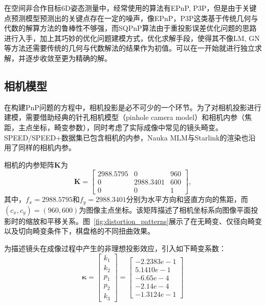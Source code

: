 在空间非合作目标6D姿态测量中，经常使用的算法有EPnP, P3P，但是由于关键点预测模型预测出的关键点存在一定的噪声，像EPnP，P3P这类基于传统几何与代数的解算方法的鲁棒性不够强，而SQPnP算法\cite{terzakis2020consistently}由于重投影误差优化问题的思路进行入手，加上其巧妙的优化问题建模方式，优化求解手段，使得其不像LM, GN等方法还需要传统的几何与代数解法的结果作为初值。可以在一开始就进行独立求解，并逐步收敛至更为精确的解。
\subsection{相机模型}
在构建PnP问题的方程中，相机投影是必不可少的一个环节。为了对相机投影进行建模，需要借助经典的针孔相机模型（pinhole camera model）和相机内参（焦距，主点坐标，畸变参数），同时考虑了实际成像中常见的镜头畸变。SPEED/SPEED+数据集已包含相机的内参，Nauka MLM与Starlink的渲染也沿用了同样的相机内参。



相机的内参矩阵$\mathbf{K}$为
\begin{equation}
	\mathbf{K} =  
	\begin{bmatrix}
		2988.5795 & 0 & 960 \\
		0 & 2988.3401 & 600 \\
		0 & 0 & 1
	\end{bmatrix},
	\label{eq:cameraMatrix}
\end{equation}
其中，$f_x=2988.5795$和$f_y=2988.3401$分别为水平方向和竖直方向的焦距，而$(c_x, c_y)=(960,600)$为图像主点坐标。该矩阵描述了相机坐标系向图像平面投影时的缩放和平移关系。图~\ref{fig:distortion_patterns}展示了在无畸变、仅径向畸变以及切向畸变条件下，棋盘格的不同扭曲效果。


为描述镜头在成像过程中产生的非理想投影效应，引入如下畸变系数：
\begin{equation}
	\boldsymbol{\kappa} =
	\begin{bmatrix}
		k_1 \\[2pt] k_2 \\[2pt] p_1 \\[2pt] p_2 \\[2pt] k_3
	\end{bmatrix}
	=
	\begin{bmatrix}
		-2.2383e-1\\[2pt]
		5.1410e-1\\[2pt]
		-6.65e-4\\[2pt]
		-2.14e-4\\[2pt]
		-1.3124e-1
	\end{bmatrix}
\end{equation}



